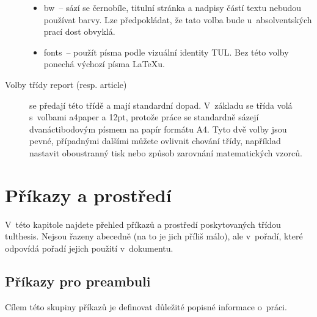 \documentclass[FF,fonts]{tulthesis}
\newcommand{\argument}[1]{{\ttfamily\color{\tulcolor}#1}}
\newcommand{\argumentindex}[1]{\argument{#1}\index{#1}}
\begin{document}
\begin{description}
\begin{itemize}
\item \argumentindex{bw}~-- sází se černobíle, titulní stránka a nadpisy částí
textu nebudou používat barvy. Lze předpokládat, že tato volba bude
u~absolventských prací dost obvyklá.

\item \argumentindex{fonts}~-- použít písma podle vizuální identity TUL. Bez
této volby ponechá výchozí písma \LaTeX u.
\end{itemize}

\item[Volby třídy \argument{report} (resp. \argument{article})] se předají této
třídě a mají standardní dopad. V~základu se třída volá s~volbami
\argument{a4paper} a \argument{12pt}, protože práce se standardně sázejí
dvanáctibodovým písmem na papír formátu A4. Tyto dvě volby jsou pevné,
případnými dalšími můžete ovlivnit chování třídy, například nastavit
oboustranný tisk nebo způsob zarovnání matematických vzorců.

\end{description}


\chapter{Příkazy a prostředí}

V~této kapitole najdete přehled příkazů a prostředí poskytovaných třídou
\argument{tulthesis}. Nejsou řazeny abecedně (na to je jich příliš málo), ale
v~pořadí, které odpovídá pořadí jejich použití v~dokumentu.


\section{Příkazy pro preambuli}\label{deklarace}

Cílem této skupiny příkazů je definovat důležité popisné informace o~práci.
\end{document}
